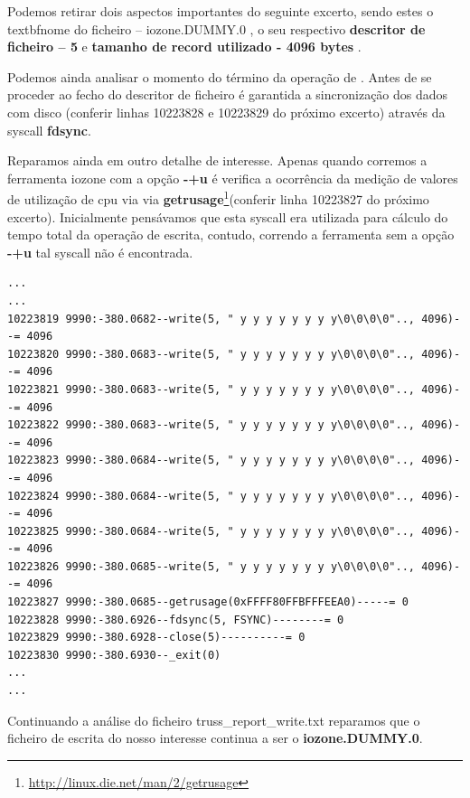 \documentclass[a4paper]{article}
\begin{document}
{Podemos retirar dois aspectos importantes do seguinte excerto, sendo estes o textbf{nome do ficheiro -- iozone.DUMMY.0} , o seu respectivo \textbf{descritor de ficheiro  -- 5}  e \textbf{ tamanho de record utilizado - 4096 bytes }.\par 
Podemos ainda analisar o momento do término da operação de . Antes de se proceder ao fecho do descritor de ficheiro é garantida a sincronização dos dados com disco (conferir linhas 10223828 e 10223829 do próximo excerto) através da syscall \textbf{fdsync}. \par 

Reparamos ainda em outro detalhe de interesse. Apenas quando corremos a ferramenta iozone com a opção \textbf{-+u} é verifica a ocorrência da medição de valores de utilização de cpu via via \textbf{getrusage}\footnote{\url{http://linux.die.net/man/2/getrusage}}(conferir linha 10223827 do próximo excerto). Inicialmente pensávamos que esta syscall era utilizada para cálculo do tempo total da operação de escrita, contudo, correndo a ferramenta sem a opção   \textbf{-+u} tal syscall não é encontrada. 

\begin{lstlisting}
...
...
10223819 9990:-380.0682--write(5, " y y y y y y y y\0\0\0\0".., 4096)--= 4096
10223820 9990:-380.0683--write(5, " y y y y y y y y\0\0\0\0".., 4096)--= 4096
10223821 9990:-380.0683--write(5, " y y y y y y y y\0\0\0\0".., 4096)--= 4096
10223822 9990:-380.0683--write(5, " y y y y y y y y\0\0\0\0".., 4096)--= 4096
10223823 9990:-380.0684--write(5, " y y y y y y y y\0\0\0\0".., 4096)--= 4096
10223824 9990:-380.0684--write(5, " y y y y y y y y\0\0\0\0".., 4096)--= 4096
10223825 9990:-380.0684--write(5, " y y y y y y y y\0\0\0\0".., 4096)--= 4096
10223826 9990:-380.0685--write(5, " y y y y y y y y\0\0\0\0".., 4096)--= 4096
10223827 9990:-380.0685--getrusage(0xFFFF80FFBFFFEEA0)-----= 0
10223828 9990:-380.6926--fdsync(5, FSYNC)--------= 0
10223829 9990:-380.6928--close(5)----------= 0
10223830 9990:-380.6930--_exit(0)
...
...
\end{lstlisting}

Continuando a análise do ficheiro truss\_report\_write.txt reparamos que o ficheiro de escrita do nosso interesse continua a ser o \textbf{iozone.DUMMY.0}.


}
\end{document}
